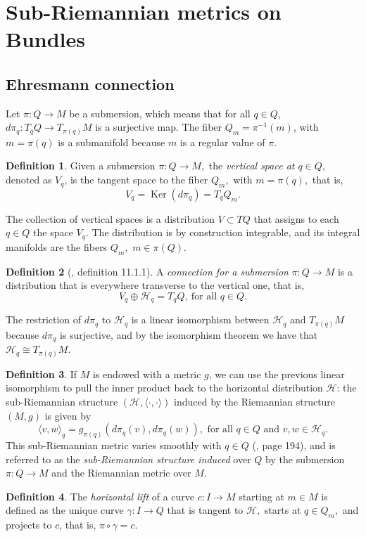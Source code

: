 \documentclass[12pt, letterpaper, reqno]{amsart}
\theoremstyle{definition}
\newtheorem{df}{Definition}
\theoremstyle{plain}
\theoremstyle{remark}
\begin{document}
\section{Sub-Riemannian metrics on Bundles}%
\label{sec:metrics_on_bundles}
\subsection{Ehresmann connection}%
\label{sub:ehresmann_connection}


Let $ \pi : Q \rightarrow {M} $ be a submersion, which means that for all $ q\in Q $, $ d\pi_q : T_q Q \rightarrow {T_{\pi(q)}}M $ is a surjective map. The fiber $ Q_m = \pi^{-1}(m) $, with $ m=\pi(q) $ is a submanifold because $ m $ is a regular value of $ \pi. $  

\begin{df}
	Given a submersion $ \pi:Q \rightarrow {M}, $ the \textit{vertical space at $ q\in Q $}, denoted as $ V_q $, is the tangent space to the fiber $ Q_m, $ with $ m=\pi(q), $ that is,  
	$$ V_q = \operatorname{Ker}(d\pi_q) = T_q Q_m.  $$ 
\end{df}

The collection of vertical spaces is a distribution $ V \subset TQ $ that assigns to each $ q\in Q $ the space $ V_q. $ The distribution is by construction integrable, and its integral manifolds are the fibers $ Q_m, $ $ m\in \pi(Q). $ 

\begin{df}[\cite{montgomery2002tour}, definition 11.1.1]
	A \textit{connection for a submersion} $ \pi:Q \rightarrow {M} $ is a distribution that is everywhere transverse to the vertical one, that is,  
	$$ V_q \oplus \mathcal{H}_q = T_q Q,\ \text{for all } q\in Q. $$ 
\end{df}

The restriction of $ d\pi_q $ to $ \mathcal{H}_q $ is a linear isomorphism between $ \mathcal{H}_q $ and $ T_{\pi(q)} M $  because $ d\pi_q $ is surjective, and by the isomorphism theorem we have that $ \mathcal{H}_q\cong T_{\pi(q)} M $. 

\begin{df}\label{df:ind_sub_struc}
If $ M $ is endowed with a metric $ g $, we can use the previous linear isomorphism to pull the inner product back to the horizontal distribution $ \mathcal{H}$: the sub-Riemannian structure $ (\mathcal{H},\langle \cdot, \cdot\rangle) $ induced by the Riemannian structure $ (M,g) $ is given by
$$ \langle v,w \rangle_q = g_{\pi(q)} \left( d\pi_q(v), d\pi_q(w) \right), \text{ for all }q\in Q \text{ and } v,w\in \mathcal{H}_q.   $$ 
This sub-Riemannian metric varies smoothly with $ q\in Q $ (\cite{montgomery2002tour}, page 194), and is referred to as the \textit{sub-Riemannian structure induced} over $ Q $ by the submersion $ \pi: Q \rightarrow M $ and the Riemannian metric over $ M. $ 
\end{df}
\begin{df}
	The \textit{horizontal lift} of a curve $ c: I \rightarrow {M} $ starting at $ m\in M $ is defined as the unique curve $ \gamma : I \rightarrow {Q} $ that is tangent to $ \mathcal{H}, $ starts at $ q\in Q_m, $ and projects to $c$, that is, $ \pi\circ\gamma = c. $ 
\end{df}
\end{document}
